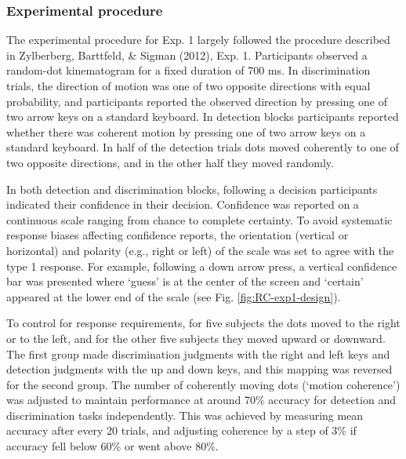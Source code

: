 \documentclass[12pt,twoside]{reedthesis}
\begin{document}
\hypertarget{experimental-procedure}{%
\subsubsection{Experimental procedure}\label{experimental-procedure}}

The experimental procedure for Exp. 1 largely followed the procedure described in Zylberberg, Barttfeld, \& Sigman (2012), Exp. 1. Participants observed a random-dot kinematogram for a fixed duration of 700 ms. In discrimination trials, the direction of motion was one of two opposite directions with equal probability, and participants reported the observed direction by pressing one of two arrow keys on a standard keyboard. In detection blocks participants reported whether there was coherent motion by pressing one of two arrow keys on a standard keyboard. In half of the detection trials dots moved coherently to one of two opposite directions, and in the other half they moved randomly.

In both detection and discrimination blocks, following a decision participants indicated their confidence in their decision. Confidence was reported on a continuous scale ranging from chance to complete certainty. To avoid systematic response biases affecting confidence reports, the orientation (vertical or horizontal) and polarity (e.g., right or left) of the scale was set to agree with the type 1 response. For example, following a down arrow press, a vertical confidence bar was presented where `guess' is at the center of the screen and `certain' appeared at the lower end of the scale (see Fig. \ref{fig:RC-exp1-design}).

To control for response requirements, for five subjects the dots moved to the right or to the left, and for the other five subjects they moved upward or downward. The first group made discrimination judgments with the right and left keys and detection judgments with the up and down keys, and this mapping was reversed for the second group. The number of coherently moving dots (`motion coherence') was adjusted to maintain performance at around 70\% accuracy for detection and discrimination tasks independently. This was achieved by measuring mean accuracy after every 20 trials, and adjusting coherence by a step of 3\% if accuracy fell below 60\% or went above 80\%.
\end{document}
